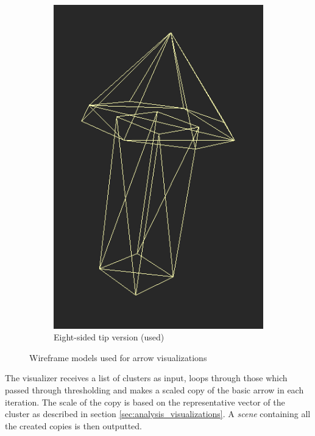 \begin{figure}[h]
\begin{subfigure}{0.3\textwidth}
	\includegraphics[width=\textwidth]{./img/8sided_arrow.PNG}
    \caption{Eight-sided tip version (used)}
    \label{fig:8sided_arrow}
	\end{subfigure}
\caption[Wireframe models used for arrow visualizations]{Wireframe models used for arrow visualizations}
\end{figure}

The visualizer receives a list of clusters as input, loops through those which passed through thresholding and makes a scaled copy of the basic arrow in each iteration. The scale of the copy is based on the representative vector of the cluster as described in section \ref{sec:analysis_visualizations}. A {\it scene} containing all the created copies is then outputted.

